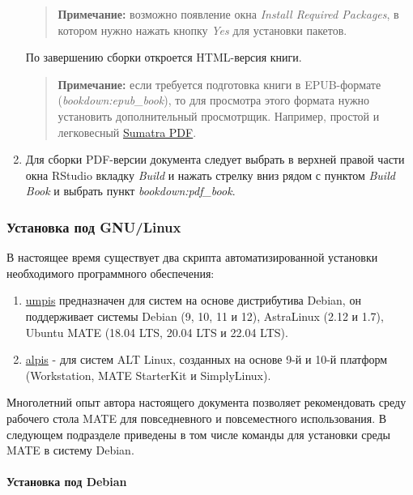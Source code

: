 \documentclass[
  a4paper,
]{book}
\providecommand{\tightlist}{%
  \setlength{\itemsep}{0pt}\setlength{\parskip}{0pt}}
\theoremstyle{definition}
\theoremstyle{definition}
\theoremstyle{definition}
\theoremstyle{definition}
\theoremstyle{remark}
\begin{document}
\begin{enumerate}
  \begin{quote}
  \textbf{Примечание:} возможно появление окна \emph{Install Required Packages},
  в котором нужно нажать кнопку \emph{Yes} для установки пакетов.
  \end{quote}

  По завершению сборки откроется HTML-версия книги.

  \begin{quote}
  \textbf{Примечание:} если требуется подготовка книги в EPUB-формате (\emph{bookdown:epub\_book}), то для просмотра этого формата
  нужно установить дополнительный просмотрщик. Например, простой и легковесный \href{https://www.sumatrapdfreader.org/dl/rel/3.4.6/SumatraPDF-3.4.6-64-install.exe}{Sumatra PDF}.
  \end{quote}
\item
  Для сборки PDF-версии документа следует выбрать в верхней правой части окна RStudio вкладку \emph{Build} и нажать стрелку вниз рядом с пунктом \emph{Build Book} и выбрать пункт \emph{bookdown:pdf\_book}.
\end{enumerate}

\hypertarget{software-r-linux}{%
\subsubsection{Установка под GNU/Linux}\label{software-r-linux}}

В настоящее время существует два скрипта автоматизированной установки необходимого программного обеспечения:

\begin{enumerate}
\def\labelenumi{\arabic{enumi}.}
\tightlist
\item
  \href{https://github.com/N0rbert/umpis}{umpis} предназначен для систем на основе дистрибутива Debian, он поддерживает системы Debian (9, 10, 11 и 12), AstraLinux (2.12 и 1.7), Ubuntu MATE (18.04 LTS, 20.04 LTS и 22.04 LTS).
\item
  \href{https://github.com/N0rbert/alpis}{alpis} - для систем ALT Linux, созданных на основе 9-й и 10-й платформ (Workstation, MATE StarterKit и SimplyLinux).
\end{enumerate}

Многолетний опыт автора настоящего документа позволяет рекомендовать среду рабочего стола MATE для повседневного и повсеместного использования. В следующем подразделе приведены в том числе команды для установки среды MATE в систему Debian.

\hypertarget{software-r-linux-debian}{%
\paragraph{Установка под Debian}\label{software-r-linux-debian}}
\end{document}
